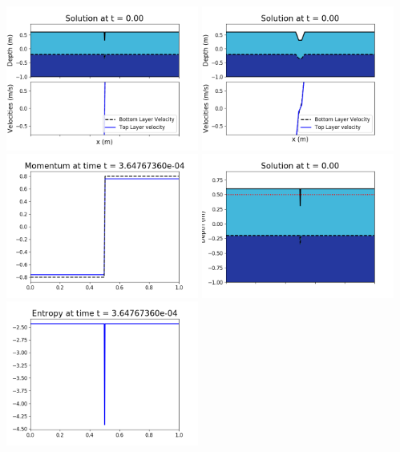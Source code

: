 \documentclass[11pt]{article}
\begin{document}
\vskip 10pt 
\includegraphics[width=0.475\textwidth]{frame0002fig1001.png}
\includegraphics[width=0.475\textwidth]{frame0002fig1002.png}
\vskip 10pt 
\includegraphics[width=0.475\textwidth]{frame0002fig1003.png}
\includegraphics[width=0.475\textwidth]{frame0002fig1006.png}
\vskip 10pt 
\includegraphics[width=0.475\textwidth]{frame0002fig1007.png}
\end{document}
